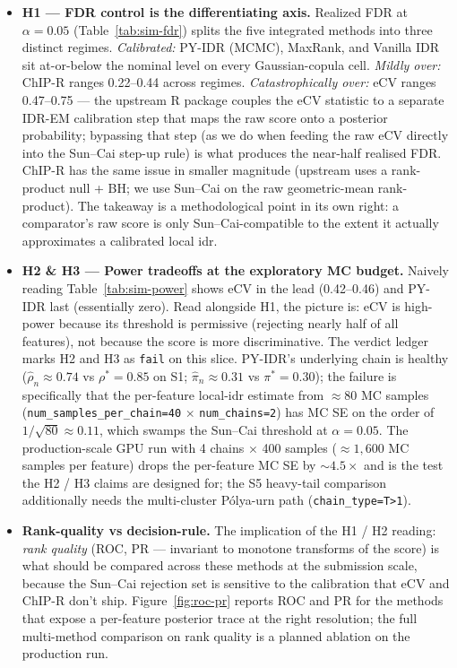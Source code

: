 \begin{itemize}[leftmargin=*]
\item \textbf{H1 --- FDR control is the differentiating axis.}
Realized FDR at $\alpha=0.05$ (Table~\ref{tab:sim-fdr}) splits the five
integrated methods into three distinct regimes. \textit{Calibrated:}
PY-IDR (MCMC), MaxRank, and Vanilla IDR sit at-or-below the nominal
level on every Gaussian-copula cell. \textit{Mildly over:} ChIP-R
ranges 0.22--0.44 across regimes. \textit{Catastrophically over:} eCV
ranges 0.47--0.75 — the upstream R package couples the eCV statistic
to a separate IDR-EM calibration step that maps the raw score onto a
posterior probability; bypassing that step (as we do when feeding the
raw eCV directly into the Sun--Cai step-up rule) is what produces the
near-half realised FDR. ChIP-R has the same issue in smaller magnitude
(upstream uses a rank-product null + BH; we use Sun--Cai on the raw
geometric-mean rank-product). The takeaway is a methodological point
in its own right: a comparator's raw score is only Sun--Cai-compatible
to the extent it actually approximates a calibrated local idr.
\item \textbf{H2 \& H3 --- Power tradeoffs at the exploratory MC budget.}
Naively reading Table~\ref{tab:sim-power} shows eCV in the lead
(0.42--0.46) and PY-IDR last (essentially zero). Read alongside H1,
the picture is: eCV is high-power because its threshold is permissive
(rejecting nearly half of all features), not because the score is more
discriminative. The verdict ledger marks H2 and H3 as \texttt{fail} on
this slice. PY-IDR's underlying chain is healthy
($\widehat\rho_n \approx 0.74$ vs $\rho^*=0.85$ on S1;
$\widehat\pi_n \approx 0.31$ vs $\pi^*=0.30$); the failure is
specifically that the per-feature local-idr estimate from $\approx 80$
MC samples (\verb|num_samples_per_chain=40| $\times$
\verb|num_chains=2|) has MC SE on the order of $1/\sqrt{80} \approx
0.11$, which swamps the Sun--Cai threshold at $\alpha=0.05$. The
production-scale GPU run with 4 chains $\times$ 400 samples
($\approx 1{,}600$ MC samples per feature) drops the per-feature MC SE
by $\sim 4.5\times$ and is the test the H2 / H3 claims are designed
for; the S5 heavy-tail comparison additionally needs the multi-cluster
Pólya-urn path (\texttt{chain\_type=T>1}).
\item \textbf{Rank-quality vs decision-rule.} The implication of the H1
/ H2 reading: \emph{rank quality} (ROC, PR — invariant to monotone
transforms of the score) is what should be compared across these
methods at the submission scale, because the Sun--Cai rejection set
is sensitive to the calibration that eCV and ChIP-R don't ship.
Figure~\ref{fig:roc-pr} reports ROC and PR for the methods that
expose a per-feature posterior trace at the right resolution; the
full multi-method comparison on rank quality is a planned ablation
on the production run.
\end{itemize}

